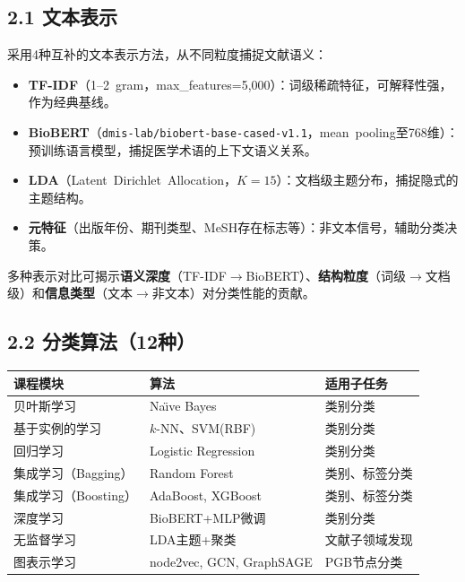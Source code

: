 \documentclass[12pt,a4paper]{ctexart}
\begin{document}
\subsection*{2.1 文本表示}

采用4种互补的文本表示方法，从不同粒度捕捉文献语义：
\begin{itemize}
  \setlength{\itemsep}{-2pt}\setlength{\parsep}{0pt}
  \item \textbf{TF-IDF}（1--2~gram，max\_features=5,000）：词级稀疏特征，可解释性强，作为经典基线。
  \item \textbf{BioBERT}（\texttt{dmis-lab/biobert-base-cased-v1.1}，mean~pooling至768维）：预训练语言模型，捕捉医学术语的上下文语义关系。
  \item \textbf{LDA}（Latent~Dirichlet~Allocation，$K=15$）：文档级主题分布，捕捉隐式的主题结构。
  \item \textbf{元特征}（出版年份、期刊类型、MeSH存在标志等）：非文本信号，辅助分类决策。
\end{itemize}
多种表示对比可揭示\textbf{语义深度}（TF-IDF$\to$BioBERT）、\textbf{结构粒度}（词级$\to$文档级）和\textbf{信息类型}（文本$\to$非文本）对分类性能的贡献。

\subsection*{2.2 分类算法（12种）}

\vspace{-2pt}
{\footnotesize
\begin{tabular}{@{}lll@{}}
\toprule
\textbf{课程模块} & \textbf{算法} & \textbf{适用子任务} \\
\midrule
贝叶斯学习           & Na{\"\i}ve Bayes & 类别分类 \\
基于实例的学习       & $k$-NN、SVM(RBF) & 类别分类 \\
回归学习             & Logistic Regression & 类别分类 \\
集成学习（Bagging）  & Random Forest & 类别、标签分类 \\
集成学习（Boosting） & AdaBoost, XGBoost & 类别、标签分类 \\
深度学习             & BioBERT+MLP微调 & 类别分类 \\
无监督学习           & LDA主题+聚类 & 文献子领域发现 \\
图表示学习          & node2vec, GCN, GraphSAGE & PGB节点分类 \\
\bottomrule
\end{tabular}\par}
\vspace{2pt}
\end{document}
